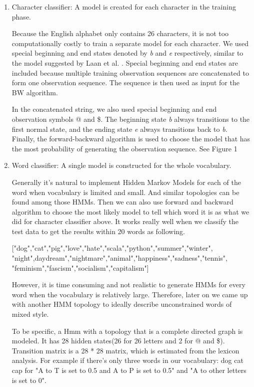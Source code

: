 \begin{enumerate}
\item	Character classifier: A model is created for each character in the training phase.

Because the English alphabet only contains 26 characters, it is not too computationally costly to train a separate model for each character.
We used special beginning and end states denoted by \textit{b} and \textit{e} respectively, similar to the model suggested by Laan et al. \cite{Laan}.
Special beginning and end states are included because multiple training observation sequences are concatenated to form one observation sequence.
The sequence is then used as input for the BW algorithm.

In the concatenated string, we also used special beginning and end observation symbols @ and \$.
The  beginning state   \textit{b} always transitions to the first normal state, and the  ending state \textit{e} always transitions back to \textit{b}.
Finally, the forward-backward algorithm is used to choose the model that has the most probability of generating the observation sequence. 
See Figure 1



\item	Word classifier: A single model is constructed for the whole vocabulary. 

Generally it’s natural to implement Hidden Markov Models for each of the word when vocabulary is limited and small. And similar topologies can be found among those HMMs. Then we can also use forward and backward algorithm to choose the most likely model to tell which word it is as what we did for character classifier above. It works really well when we classify the test data to get the results within 20 words as following.

["dog","cat","pig","love","hate","scala","python","summer","winter",\\"night",daydream","nightmare","animal","happiness","sadness","tennis",\\"feminism","fascism","socialism","capitalism"]

However, it is time consuming and not realistic to generate HMMs for every word when the vocabulary is relatively large. Therefore, later on we came up with another HMM topology to ideally describe unconstrained words of mixed style.

To be specific, a Hmm  with a topology that is a complete directed graph is modeled. It has 28 hidden states(26 for 26 letters and 2 for @ and \$). 
Transition matrix is a 28 * 28 matrix, which is estimated from the lexicon analysis. For example if there's only three words in our vocabulary: dog cat cap for "A to T is set to 0.5 and A to P is set to 0.5" and "A to other letters is set to 0".


\end{enumerate}
